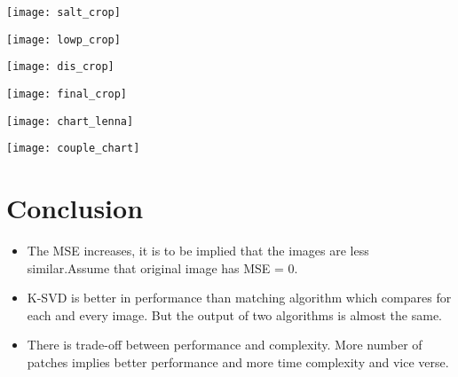 \documentclass[journal]{IEEEtran}
\begin{document}
	    \begin{minipage}{\linewidth}
    		\centering
    		\texttt{[image: salt\_crop]}
	    \end{minipage} 
	    
	    \begin{minipage}{\linewidth}
    		\centering
    		\texttt{[image: lowp\_crop]}
	    \end{minipage} 
	    
	    \begin{minipage}{\linewidth}
    		\centering
    		\texttt{[image: dis\_crop]}
	    \end{minipage} 
	    
	    \begin{minipage}{\linewidth}
    		\centering
    		\texttt{[image: final\_crop]}
	    \end{minipage} 
	    
	    \begin{minipage}{\linewidth}
    		\centering
    		\texttt{[image: chart\_lenna]}
	    \end{minipage} 
	    
	    \begin{minipage}{\linewidth}
    		\centering
    		\texttt{[image: couple\_chart]}
	    \end{minipage} 
	
	\section{\textbf{Conclusion}}
	\begin{itemize}
	    \item The MSE increases, it is to be implied that the images are less similar.Assume that original image has MSE = 0.
	    \item K-SVD is better in performance than matching algorithm which compares for each and every image. But the output of two algorithms is almost the same.
	    \item There is trade-off between performance and complexity. More number of patches implies better performance and more time complexity and vice verse.
	\end{itemize}
	
\end{document}
